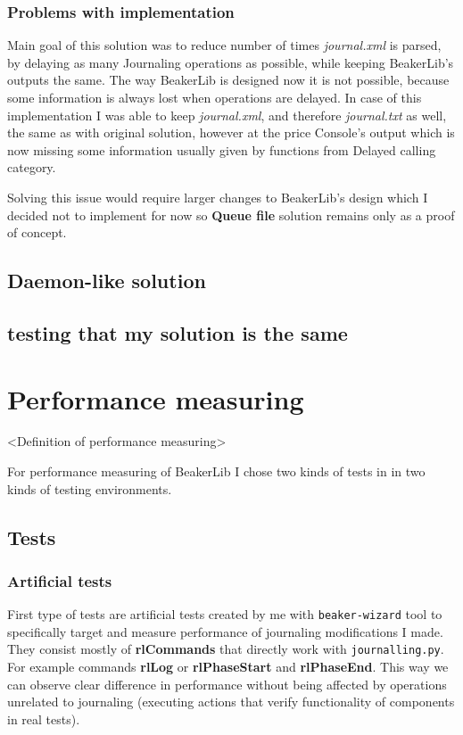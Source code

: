 \subsection{Problems with implementation}
Main goal of this solution was to reduce number of times \textit{journal.xml} is parsed, by delaying as many Journaling operations as possible, while keeping BeakerLib's outputs the same. The way BeakerLib is designed now it is not possible, because some information is always lost when operations are delayed. In case of this implementation I was able to keep \textit{journal.xml}, and therefore \textit{journal.txt}  as well, the same as with original solution, however at the price Console's output which is now missing some information usually given by functions from Delayed calling category.

Solving this issue would require larger changes to BeakerLib's design which I decided not to implement for now so \textbf{Queue file} solution remains only as a proof of concept.

\section{Daemon-like solution}

\section{testing that my solution is the same}

\chapter{Performance measuring}
\label{performance}
<Definition of performance measuring>

For performance measuring of BeakerLib I chose two kinds of tests in in two kinds of testing environments.

\section{Tests}

\subsection{Artificial tests}
First type of tests are artificial tests created by me with \texttt{beaker-wizard} tool to specifically target and measure performance of journaling modifications I made. They consist mostly of \textbf{rlCommands} that directly work with \texttt{journalling.py}. For example commands \textbf{rlLog} or \textbf{rlPhaseStart} and \textbf{rlPhaseEnd}. This way we can observe clear difference in performance without being affected by operations unrelated to journaling (executing actions that verify functionality of components in real tests). 

